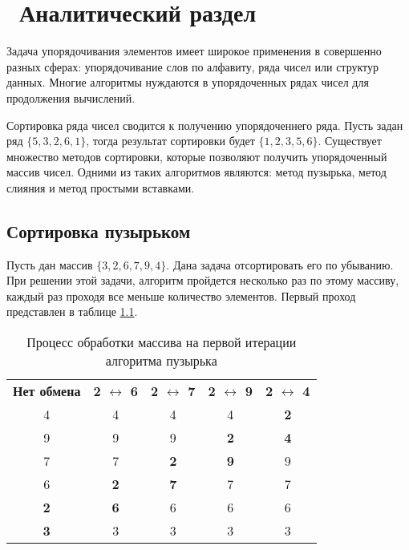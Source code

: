 \chapter{ Аналитический раздел}
\label{cha:analysis}

Задача упорядочивания элементов имеет широкое применения в совершенно разных сферах: упорядочивание слов по алфавиту, ряда чисел или структур данных. Многие алгоритмы нуждаются в упорядоченных рядах чисел для продолжения вычислений.

Сортировка ряда чисел сводится к получению упорядоченнего ряда. Пусть задан ряд $\{5, 3, 2, 6, 1\}$, тогда результат сортировки будет $\{1, 2, 3, 5, 6\}$. Существует множество методов сортировки, которые позволяют получить упорядоченный массив чисел. Одними из таких алгоритмов являются: метод пузырька, метод слияния и метод простыми вставками.

\section{ Сортировка пузырьком}

Пусть дан массив $\{3, 2, 6, 7, 9, 4\}$. Дана задача отсортировать его по убыванию. При решении этой задачи, алгоритм пройдется несколько раз по этому массиву, каждый раз проходя все меньше количество элементов. Первый проход представлен в таблице \ref{table:bubble}.

\begin{table}
	\caption{Процесс обработки массива на первой итерации алгоритма пузырька}\label{table:bubble}
	\begin{center}
		\begin{tabular}{ccccc}
            \textbf{Нет обмена} & \textbf{2 $\leftrightarrow$ 6} & \textbf{2 $\leftrightarrow$ 7} & \textbf{2 $\leftrightarrow$ 9} & \textbf{2 $\leftrightarrow$ 4}\\
            4 & 4 & 4 & 4 & \textbf{2} \\
            9 & 9 & 9 & \textbf{2} & \textbf{4} \\
            7 & 7 & \textbf{2} & \textbf{9} & 9 \\
            6 & \textbf{2} & \textbf{7} & 7 & 7 \\
            \textbf{2} & \textbf{6} & 6 & 6 & 6 \\
            \textbf{3} & 3 & 3 & 3 & 3\\
		\end{tabular}
	\end{center}
\end{table}

